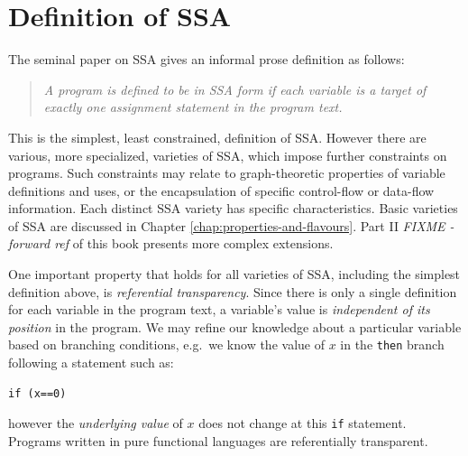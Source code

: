 
\section{Definition of SSA}


The seminal paper on SSA 
\cite{cytron91efficiently}
gives an informal prose
definition as follows:

\begin{quotation}
\textit{
A program is defined to be in SSA
form if each variable is a target of
exactly one assignment statement in the
program text.
}
\end{quotation}



This is the simplest,
least constrained, definition of SSA. However
there are various, more specialized, varieties of SSA,
which impose further constraints on programs.
Such constraints may relate to %
graph-theoretic properties of variable definitions and uses, or
the encapsulation of specific control-flow or data-flow information.
Each distinct SSA variety has specific characteristics. Basic
varieties
of SSA are discussed in
Chapter \ref{chap:properties-and-flavours}.
Part II \emph{FIXME - forward ref} 
of this book presents more complex extensions.


One important property that holds for all varieties of SSA,
including the simplest definition above, is 
\emph{referential transparency}.
Since there is only a single definition for each variable
in the program text, a variable's value
is \textit{independent of
its position} in the program.
We may refine our knowledge about a particular variable
based on branching conditions, e.g.\ we know the value of $x$ in the
\texttt{then} branch following a statement such as:
\begin{verbatim}
if (x==0)
\end{verbatim}
however the
\textit{underlying value} of $x$
does not change at this \texttt{if} statement.
Programs written in pure functional languages
are referentially transparent.

